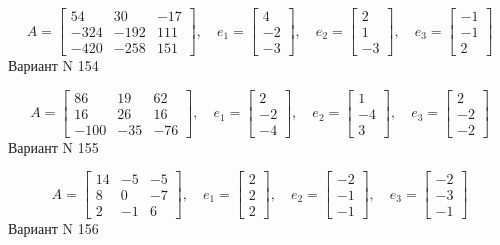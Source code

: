 \documentclass[11pt]{report}
\begin{document}
$$A = \left[\begin{matrix}54 & 30 & -17\\-324 & -192 & 111\\-420 & -258 & 151\end{matrix}\right],\quad e_1 = \left[\begin{matrix}4\\-2\\-3\end{matrix}\right],\quad e_2 = \left[\begin{matrix}2\\1\\-3\end{matrix}\right],\quad e_3 = \left[\begin{matrix}-1\\-1\\2\end{matrix}\right]$$Вариант N 154

$$A = \left[\begin{matrix}86 & 19 & 62\\16 & 26 & 16\\-100 & -35 & -76\end{matrix}\right],\quad e_1 = \left[\begin{matrix}2\\-2\\-4\end{matrix}\right],\quad e_2 = \left[\begin{matrix}1\\-4\\3\end{matrix}\right],\quad e_3 = \left[\begin{matrix}2\\-2\\-2\end{matrix}\right]$$Вариант N 155

$$A = \left[\begin{matrix}14 & -5 & -5\\8 & 0 & -7\\2 & -1 & 6\end{matrix}\right],\quad e_1 = \left[\begin{matrix}2\\2\\2\end{matrix}\right],\quad e_2 = \left[\begin{matrix}-2\\-1\\-1\end{matrix}\right],\quad e_3 = \left[\begin{matrix}-2\\-3\\-1\end{matrix}\right]$$Вариант N 156
\end{document}
